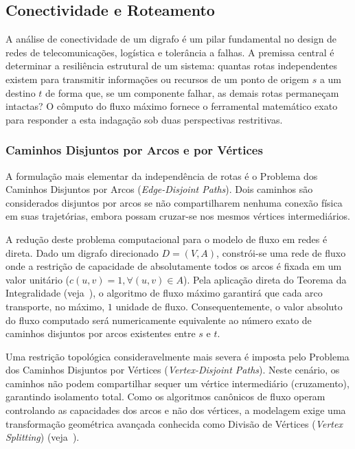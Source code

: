 \documentclass[12pt,a4paper]{article}
\begin{document}
\subsection{Conectividade e Roteamento}

A análise de conectividade de um digrafo é um pilar fundamental no design de redes de telecomunicações, logística e tolerância a falhas. A premissa central é determinar a resiliência estrutural de um sistema: quantas rotas independentes existem para transmitir informações ou recursos de um ponto de origem $s$ a um destino $t$ de forma que, se um componente falhar, as demais rotas permaneçam intactas? O cômputo do fluxo máximo fornece o ferramental matemático exato para responder a esta indagação sob duas perspectivas restritivas.

\subsubsection{Caminhos Disjuntos por Arcos e por Vértices}

A formulação mais elementar da independência de rotas é o Problema dos Caminhos Disjuntos por Arcos (\textit{Edge-Disjoint Paths}). Dois caminhos são considerados disjuntos por arcos se não compartilharem nenhuma conexão física em suas trajetórias, embora possam cruzar-se nos mesmos vértices intermediários.

A redução deste problema computacional para o modelo de fluxo em redes é direta. Dado um digrafo direcionado $D = (V, A)$, constrói-se uma rede de fluxo onde a restrição de capacidade de absolutamente todos os arcos é fixada em um valor unitário ($c(u,v) = 1, \forall (u,v) \in A$). Pela aplicação direta do Teorema da Integralidade (veja~\cite{cook1998combinatorial}), o algoritmo de fluxo máximo garantirá que cada arco transporte, no máximo, $1$ unidade de fluxo. Consequentemente, o valor absoluto do fluxo computado será numericamente equivalente ao número exato de caminhos disjuntos por arcos existentes entre $s$ e $t$.

Uma restrição topológica consideravelmente mais severa é imposta pelo Problema dos Caminhos Disjuntos por Vértices (\textit{Vertex-Disjoint Paths}). Neste cenário, os caminhos não podem compartilhar sequer um vértice intermediário (cruzamento), garantindo isolamento total. Como os algoritmos canônicos de fluxo operam controlando as capacidades dos arcos e não dos vértices, a modelagem exige uma transformação geométrica avançada conhecida como Divisão de Vértices (\textit{Vertex Splitting}) (veja~\cite{ahuja1993network}).
\end{document}
